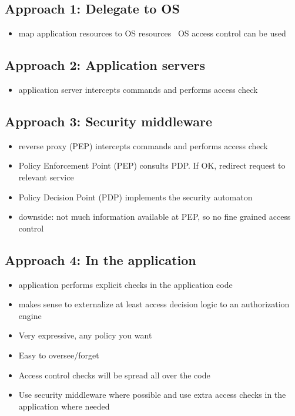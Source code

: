 \documentclass[12pt,titlepage,a4paper]{report}
\begin{document}
			\subsection{Approach 1: Delegate to OS}
			\begin{itemize}
				\item map application resources to OS resources \textrightarrow \, OS access control can be used
			\end{itemize}
			\subsection{Approach 2: Application servers}
			\begin{itemize}
				\item application server intercepts commands and performs access check
			\end{itemize}
			\subsection{Approach 3: Security middleware}
			\begin{itemize}
				\item reverse proxy (PEP) intercepts commands and performs access check
				\item Policy Enforcement Point (PEP)
					\subitem consults PDP. If OK, redirect request to relevant service
				\item Policy Decision Point (PDP)
					\subitem implements the security automaton
				\item downside: not much information available at PEP, so no fine grained access control
			\end{itemize}
			\subsection{Approach 4: In the application}
			\begin{itemize}
				\item application performs explicit checks in the application code
				\item makes sense to externalize at least access decision logic to an authorization engine
				\item Very expressive, any policy you want
				\item Easy to oversee/forget
				\item Access control checks will be spread all over the code
				\item[\textrightarrow] Use security middleware where possible and use extra access checks in the application where needed
			\end{itemize}
\end{document}
